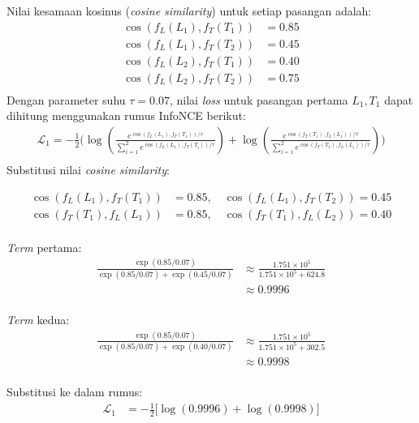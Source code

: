 \medskip
Nilai kesamaan kosinus (\textit{cosine similarity}) untuk setiap pasangan adalah:
\bigskip
\begin{align*}
    \cos(f_L(L_1), f_T(T_1)) &= 0.85 \\
    \cos(f_L(L_1), f_T(T_2)) &= 0.45 \\
    \cos(f_L(L_2), f_T(T_1)) &= 0.40 \\
    \cos(f_L(L_2), f_T(T_2)) &= 0.75 \\
\end{align*}
Dengan parameter suhu $\tau = 0.07$, nilai \textit{loss} untuk pasangan pertama $L_1, T_1$ dapat dihitung menggunakan rumus InfoNCE berikut:\\
\bigskip
\begin{align*}
\mathcal{L}_1 = - \frac{1}{2} \Bigg(
    \log \left( \frac{e^{\cos(f_L(L_1), f_T(T_1)) / \tau}}
    {\sum_{i=1}^{2} e^{\cos(f_L(L_1), f_T(T_i)) / \tau}} \right)
    + \log \left( \frac{e^{\cos(f_T(T_1), f_L(L_1)) / \tau}}
    {\sum_{i=1}^{2} e^{\cos(f_T(T_1), f_L(L_i)) / \tau}} \right)
\Bigg)\\
\end{align*}
Substitusi nilai \textit{cosine similarity}:

\begin{align*}
    \cos(f_L(L_1), f_T(T_1)) &= 0.85, \quad \cos(f_L(L_1), f_T(T_2)) = 0.45 \\
    \cos(f_T(T_1), f_L(L_1)) &= 0.85, \quad \cos(f_T(T_1), f_L(L_2)) = 0.40\\
\end{align*}

\textit{Term} pertama: \\
\begin{align*}
    \frac{\exp(0.85 / 0.07)}{\exp(0.85 / 0.07) + \exp(0.45 / 0.07)} 
    &\approx \frac{1.751 \times 10^5}{1.751 \times 10^5 + 624.8} \\
    &\approx 0.9996\\
\end{align*}

\textit{Term} kedua:\\
\begin{align*}
    \frac{\exp(0.85 / 0.07)}{\exp(0.85 / 0.07) + \exp(0.40 / 0.07)} 
    &\approx \frac{1.751 \times 10^5}{1.751 \times 10^5 + 302.5} \\
    &\approx 0.9998\\
\end{align*}

Substitusi ke dalam rumus:\\
\begin{align*}
    \mathcal{L}_1 &= - \frac{1}{2} \bigg[ \log(0.9996) + \log(0.9998)
    \bigg]\\
\end{align*}

